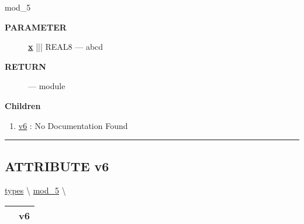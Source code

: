 \par





mod\_5






\par
\begin{description}
\item [\colorbox{tagtype}{\color{white} \textbf{\textsf{PARAMETER}}}] \textbf{\underline{x}} ||| REAL8 --- abcd
\end{description}







\par
\begin{description}
\item [\colorbox{tagtype}{\color{white} \textbf{\textsf{RETURN}}}] \textbf{} --- module
\end{description}




\textbf{Children}
\begin{enumerate}
\item \hyperlink{ecldoc:types.mod_5.v6}{v6}
: No Documentation Found
\end{enumerate}

\rule{\linewidth}{0.5pt}

\subsection*{\textsf{\colorbox{headtoc}{\color{white} ATTRIBUTE}
v6}}

\hypertarget{ecldoc:types.mod_5.v6}{}
\hspace{0pt} \hyperlink{ecldoc:types}{types} \textbackslash 
\hspace{0pt} \hyperlink{ecldoc:types.mod_5}{mod_5} \textbackslash 

{\renewcommand{\arraystretch}{1.5}
\begin{tabularx}{\textwidth}{|>{\raggedright\arraybackslash}l|X|}
\hline
\hspace{0pt}\mytexttt{\color{red} } & \textbf{v6} \\
\hline
\end{tabularx}
}

\par





